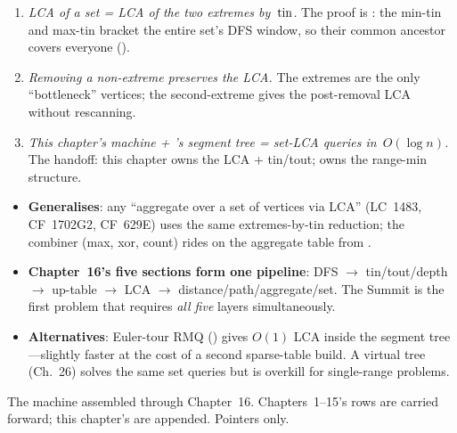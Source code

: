 \begin{insightbox}
\begin{enumerate}[nosep, leftmargin=1.6em]
  \item \emph{LCA of a set = LCA of the two extremes by~\(\operatorname{tin}\).}
        The proof is : the min-tin and
        max-tin bracket the entire set's DFS window, so their common
        ancestor covers everyone ().
  \item \emph{Removing a non-extreme preserves the LCA.} The extremes
        are the only ``bottleneck'' vertices; the second-extreme gives
        the post-removal LCA without rescanning.
  \item \emph{This chapter's machine + 's segment tree =
        set-LCA queries in~\(O(\log n)\).} The handoff: this chapter
        owns the LCA + tin/tout;  owns the range-min structure.
\end{enumerate}
\end{insightbox}

\begin{hardeningbox}
\begin{itemize}[nosep, leftmargin=1.4em]
  \item \textbf{Generalises}: any ``aggregate over a set of vertices
        via LCA'' (LC~1483, CF~1702G2, CF~629E) uses the same
        extremes-by-tin reduction; the combiner (max, xor, count)
        rides on the aggregate table from .
  \item \textbf{Chapter~16's five sections form one pipeline}: DFS
        \(\to\) tin/tout/depth \(\to\) up-table \(\to\) LCA \(\to\)
        distance/path/aggregate/set. The Summit is the first problem
        that requires \emph{all five} layers simultaneously.
  \item \textbf{Alternatives}: Euler-tour RMQ ()
        gives \(O(1)\) LCA inside the segment tree---slightly faster
        at the cost of a second sparse-table build.  A virtual tree
        (Ch.~26) solves the same set queries but is overkill for
        single-range problems.
\end{itemize}
\end{hardeningbox}


The machine assembled through Chapter~16. Chapters~1--15's rows are
carried forward; this chapter's are appended. Pointers only.


